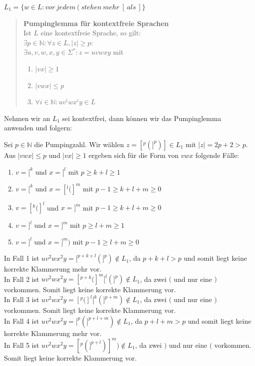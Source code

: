 \begin{teile}
	\item
	$L_1 = \{ w \in L: vor\ jedem\ (\ stehen\ mehr\ [\ als\ ] \}$ 
	
	\begin{quote}
		\textbf{Pumpinglemma für kontextfreie Sprachen} \\
		Ist $L$ eine kontextfreie Sprache, so gilt: \\
		$\exists p \in \mathbb{N}: \forall z \in L, |z| \geq p:$ \\
		$\exists u,v,w,x,y \in \Sigma^*: z = uvwxy$ mit
		\begin{enumerate}
			\item $|vx| \geq 1$
			\item $|vwx| \leq p$
			\item $\forall i \in \mathbb{N} : uv^{i}wx^{i}y \in L$
		\end{enumerate}
	\end{quote}

	Nehmen wir an $L_1$ sei kontextfrei, dann können wir das Pumpinglemma anwenden und folgern:
	
	Sei $p \in \mathbb{N}$ die Pumpingzahl. Wir wählen $z = [^p(]^p)] \in L_1$ mit $|z| = 2p+2 > p$.\\
	Aus $|vwx| \leq p$ und $|vx| \geq 1$ ergeben sich für die Form von $vwx$ folgende Fälle:
	\begin{enumerate}
		\item $v=[^k$ und $x=[^l$ mit $p \geq k+l  \geq 1$
		\item $v=[^k$ und $x=[^l(]^m$ mit $p-1 \geq k+l+m  \geq 0$
		\item $v=[^k(]^l$ und $x=]^m$ mit $p-1 \geq k+l+m  \geq 0$
		\item $v=]^l$ und $x=]^m$ mit $p \geq l+m  \geq 1$
		\item $v=]^l$ und $x=]^m)$ mit $p-1 \geq l+m  \geq 0$
	\end{enumerate}

	In Fall 1 ist $uv^2wx^2y=[^{p+k+l}(]^{p}) \notin L_1$, da $p+k+l > p$ und somit liegt keine korrekte Klammerung mehr vor.\\
	In Fall 2 ist $uv^2wx^2y=[^{p+k}(]^{m}[^{l}(]^{p}) \notin L_1$, da zwei $($ und nur eine $)$ vorkommen. Somit liegt keine korrekte Klammerung vor.\\
	In Fall 3 ist $uv^2wx^2y=[^{p}(]^{l}[^{k}(]^{p+m}) \notin L_1$, da zwei $($ und nur eine $)$ vorkommen. Somit liegt keine korrekte Klammerung vor.\\
	In Fall 4 ist $uv^2wx^2y=[^{p}(]^{p+l+m}) \notin L_1$, da $p+l+m > p$ und somit liegt keine korrekte Klammerung mehr vor.\\
	In Fall 5 ist $uv^2wx^2y=[^{p}(]^{p+l})]^{m}) \notin L_1$, da zwei $)$ und nur eine $($ vorkommen. Somit liegt keine korrekte Klammerung vor.
	

\end{teile}

